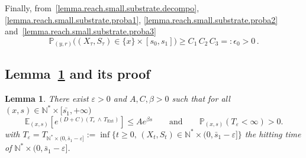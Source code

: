 \documentclass[10pt]{amsart}
\newtheorem{lemm}[theo]{Lemma}\newtheorem{prop}[theo]{Proposition}\newtheorem{coro}[theo]{Corollary}\newtheorem{conj}[theo]{Conjecture}
\theoremstyle{definition}\newtheorem{defi}[theo]{Definition}\newtheorem{rema}[theo]{Remark}\newtheorem{exam}[theo]{Example}\newtheorem{exem}[theo]{Example}\newtheorem{nota}[theo]{Notation}
\newcommand{\PP}{\mathbb{P}}
\newcommand{\NN}{\mathbb{N}}
\newcommand{\EE}{\mathbb{E}}
\newcommand{\Text}{T_{\mathrm{Ext}}}
\newcommand{\1}{\mathbf{1}}
\begin{document}
Finally, from~\eqref{lemma.reach.small.substrate.decompo}, \eqref{lemma.reach.small.substrate.proba1}, \eqref{lemma.reach.small.substrate.proba2} and~\eqref{lemma.reach.small.substrate.proba3}
\[
\PP_{(y,r)}\big((X_\tau,S_\tau)\in\{x\}\times [s_0,s_1]\big)
\geq C_1\,C_2\,C_3=:\epsilon_0>0\,.
\]



\subsection{ Lemma~\ref{lem:lyap2} and its proof}



\begin{lemm}\label{lem:lyap2}
There exist $\varepsilon>0$ and $A,C, \beta>0$ such that for all $(x,s) \in \NN^* \times [\bar{s_1}, +\infty)$
\[
\EE_{(x,s)}\left[e^{(D+C)(T_\varepsilon\,\wedge\,\Text)} \right] \leq A e^{\beta s} \qquad
\text{and} \qquad
\PP_{(x,s)}(T_\varepsilon<\infty)>0.
\]
with $T_\varepsilon=T_{ \NN^*\times (0,\bar s_1-\varepsilon]}:=\inf\{t\geq 0, \, (X_t,S_t)\in \NN^*\times (0,\bar s_1-\varepsilon]\}$ the hitting time of $\NN^*\times (0,\bar s_1-\varepsilon]$.
\end{lemm}
\end{document}
